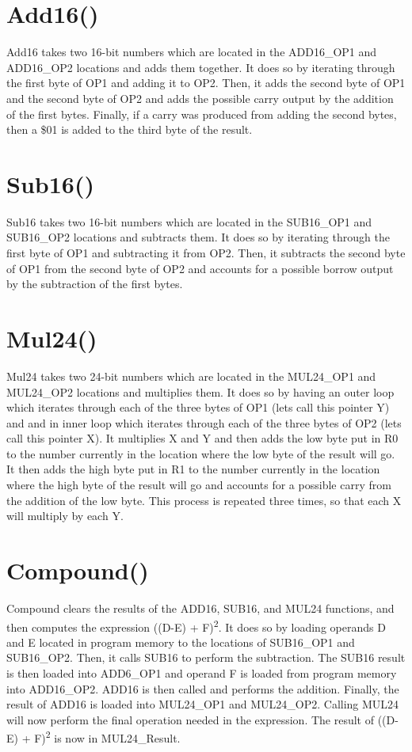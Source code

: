 \documentclass[12pt,letterpaper]{article}
\begin{document}
\section{Add16()}
	Add16 takes two 16-bit numbers which are located in the ADD16\_OP1 and ADD16\_OP2 locations and adds them together.
	It does so by iterating through the first byte of OP1 and adding it to OP2.
	Then, it adds the second byte of OP1 and the second byte of OP2 and adds the possible carry output by the addition of the first bytes.
	Finally, if a carry was produced from adding the second bytes, then a \$01 is added to the third byte of the result.


\section{Sub16()}
	Sub16 takes two 16-bit numbers which are located in the SUB16\_OP1 and SUB16\_OP2 locations and subtracts them.
	It does so by iterating through the first byte of OP1 and subtracting it from OP2.
	Then, it subtracts the second byte of OP1 from the second byte of OP2 and accounts for a possible borrow output by the subtraction of the first bytes.
	
	
\section{Mul24()}
	Mul24 takes two 24-bit numbers which are located in the MUL24\_OP1 and MUL24\_OP2 locations and multiplies them.
	It does so by having an outer loop which iterates through each of the three bytes of OP1 (lets call this pointer Y) and and in inner loop which iterates through each of the three bytes of OP2 (lets call this pointer X).
	It multiplies X and Y and then adds the low byte put in R0 to the number currently in the location where the low byte of the result will go.
	It then adds the high byte put in R1 to the number currently in the location where the high byte of the result will go and accounts for a possible carry from the addition of the low byte.
	This process is repeated three times, so that each X will multiply by each Y.


\section{Compound()}
	Compound clears the results of the ADD16, SUB16, and MUL24 functions, and then computes the expression ((D-E) + F)\textsuperscript{2}.
	It does so by loading operands D and E located in program memory to the locations of SUB16\_OP1 and SUB16\_OP2.
	Then, it calls SUB16 to perform the subtraction.
	The SUB16 result is then loaded into ADD6\_OP1 and operand F is loaded from program memory into ADD16\_OP2.
	ADD16 is then called and performs the addition.
	Finally, the result of ADD16 is loaded into MUL24\_OP1 and MUL24\_OP2.
	Calling MUL24 will now perform the final operation needed in the expression.
	The result of ((D-E) + F)\textsuperscript{2} is now in MUL24\_Result.
\end{document}
